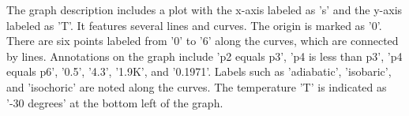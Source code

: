 The graph description includes a plot with the x-axis labeled as 's' and the y-axis labeled as 'T'. It features several lines and curves. The origin is marked as '0'. There are six points labeled from '0' to '6' along the curves, which are connected by lines. Annotations on the graph include 'p2 equals p3', 'p4 is less than p3', 'p4 equals p6', '0.5', '4.3', '1.9K', and '0.1971'. Labels such as 'adiabatic', 'isobaric', and 'isochoric' are noted along the curves. The temperature 'T' is indicated as '-30 degrees' at the bottom left of the graph.